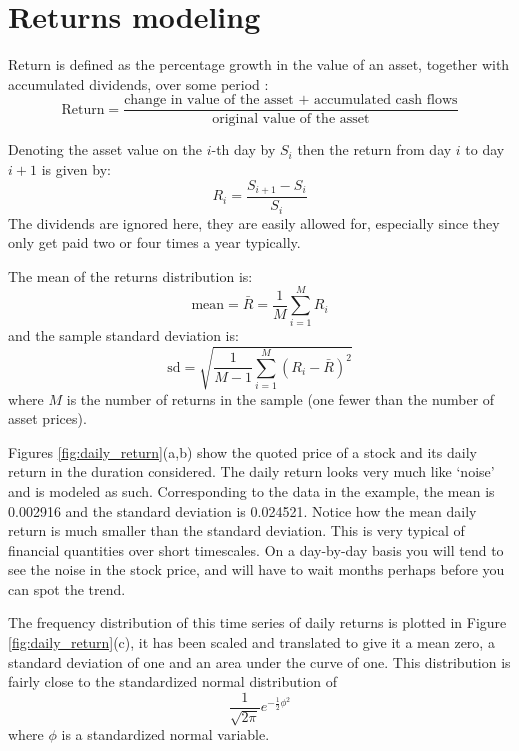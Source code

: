 \section{Returns modeling}
\label{sec:randomness_assets}
Return is defined as the percentage growth in the value of an asset, together with accumulated dividends, over some period \citep{pw_iqf2ed_2007}:
\begin{equation}
    \text{Return} = \frac{\text{change in value of the asset + accumulated cash flows}}{\text{original value of the asset}}
\end{equation}

Denoting the asset value on the $i$-th day by $S_i$ then the return from day $i$ to day $i+1$ is given by:
\begin{equation}
     R_i = \frac{S_{i+1} - S_i}{S_i}
\end{equation}
The dividends are ignored here, they are easily allowed for, especially since they only get
paid two or four times a year typically. 

The mean of the returns distribution is:
\begin{equation}
    \text{mean} = \bar{R} = \frac{1}{M} \sum_{i = 1}^{M} R_i
    \label{equ:mean}
\end{equation}
and the sample standard deviation is:
\begin{equation}
    \text{sd} = \sqrt{\frac{1}{M-1} \sum_{i = 1}^{M} \left( R_i - \bar{R} \right)^2}
    \label{equ:std}
\end{equation}
where $M$ is the number of returns in the sample (one fewer than the number of asset prices). 

Figures \ref{fig:daily_return}(a,b) show the quoted price of a stock and its daily return in the duration considered. The daily return looks very much like `noise' and is modeled as such. Corresponding to the data in the example, the mean is 0.002916 and the standard deviation is 0.024521. Notice how the mean daily return is much smaller than the standard deviation. This is very typical of financial quantities over short timescales. On a day-by-day basis you will tend to see the noise in the stock price, and will have to wait months perhaps before you can spot the trend.

The frequency distribution of this time series of daily returns is plotted in Figure \ref{fig:daily_return}(c), it has been scaled and translated to give it a mean zero, a standard deviation of one and an area under the curve of one. This distribution is fairly close to the standardized normal distribution of
\begin{equation}
    \frac{1}{\sqrt{2\pi}} e^{-\frac{1}{2}\phi^2}
\end{equation}
where $\phi$ is a standardized normal variable.

